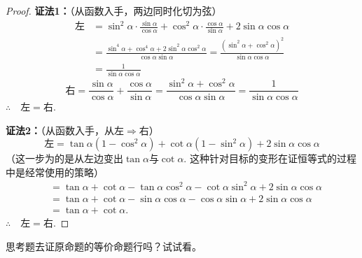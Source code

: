 \begin{proof}
\textbf{证法1：}（从函数入手，两边同时化切为弦）
\[\begin{split}
    \text{左}&=\sin^2\alpha\cdot \frac{\sin\alpha}{\cos\alpha}+\cos^2\alpha\cdot \frac{\cos\alpha}{\sin\alpha}+2\sin\alpha\cos\alpha\\
    &=\frac{\sin^4\alpha+\cos^4\alpha+2\sin^2\alpha\cos^2\alpha}{\cos\alpha\sin\alpha}=\frac{(\sin^2\alpha+\cos^2\alpha)^2}{\sin\alpha\cos\alpha}\\
    &=\frac{1}{\sin\alpha\cos\alpha}
\end{split}\]
\[\text{右}=\frac{\sin\alpha}{\cos\alpha}+\frac{\cos\alpha}{\sin\alpha}=\frac{\sin^2\alpha+\cos^2\alpha}{\cos\alpha\sin\alpha}=\frac{1}{\sin\alpha\cos\alpha}\]
$\therefore\quad \text{左}=\text{右}$.

\textbf{证法2：}（从函数入手，从左$\Rightarrow$右）
\[\text{左}=\tan\alpha(1-\cos^2\alpha)+\cot\alpha(1-\sin^2\alpha)+2\sin\alpha\cos\alpha\]
（这一步为的是从左边变出$\tan\alpha$与$\cot\alpha$. 这种针对目标的变形在证恒等式的过程中是经常使用的策略）
\[\begin{split}
&=\tan\alpha+\cot\alpha-\tan\alpha\cos^2\alpha-\cot\alpha\sin^2\alpha+2\sin\alpha\cos\alpha\\
&=\tan\alpha+\cot\alpha-\sin\alpha\cos\alpha-\cos\alpha\sin\alpha+2\sin\alpha\cos\alpha\\
&=\tan\alpha+\cot\alpha.    
\end{split}\]
$\therefore\quad \text{左}=\text{右}$.
\end{proof}



\begin{thm}
    {思考题}去证原命题的等价命题行吗？试试看。
\end{thm}

